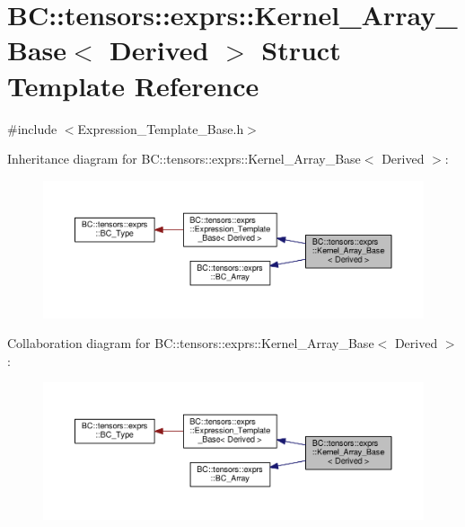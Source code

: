 \hypertarget{structBC_1_1tensors_1_1exprs_1_1Kernel__Array__Base}{}\section{BC\+:\+:tensors\+:\+:exprs\+:\+:Kernel\+\_\+\+Array\+\_\+\+Base$<$ Derived $>$ Struct Template Reference}
\label{structBC_1_1tensors_1_1exprs_1_1Kernel__Array__Base}


{\ttfamily \#include $<$Expression\+\_\+\+Template\+\_\+\+Base.\+h$>$}



Inheritance diagram for BC\+:\+:tensors\+:\+:exprs\+:\+:Kernel\+\_\+\+Array\+\_\+\+Base$<$ Derived $>$\+:
\nopagebreak
\begin{figure}[H]
\begin{center}
\leavevmode
\includegraphics[width=350pt]{structBC_1_1tensors_1_1exprs_1_1Kernel__Array__Base__inherit__graph}
\end{center}
\end{figure}


Collaboration diagram for BC\+:\+:tensors\+:\+:exprs\+:\+:Kernel\+\_\+\+Array\+\_\+\+Base$<$ Derived $>$\+:
\nopagebreak
\begin{figure}[H]
\begin{center}
\leavevmode
\includegraphics[width=350pt]{structBC_1_1tensors_1_1exprs_1_1Kernel__Array__Base__coll__graph}
\end{center}
\end{figure}
